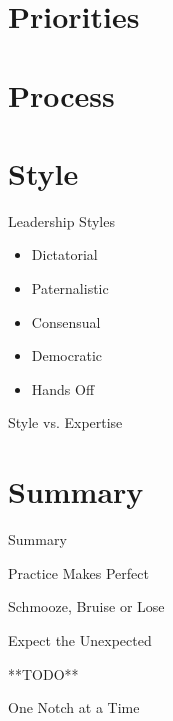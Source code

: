\documentclass[14pt]{beamer}
\begin{document}
  \section{Priorities}
    \blankscreen

    \begin{frame}{}
      
    \end{frame}

  \section{Process}
    \blankscreen

  \section{Style}

    \begin{frame}{Leadership Styles}
      \begin{itemize}
        \item Dictatorial
        \item Paternalistic
        \item Consensual
        \item Democratic
        \item Hands Off
      \end{itemize}
    \end{frame}

    \begin{frame}{Style vs. Expertise}
      
    \end{frame}

  \section*{Summary}

    \begin{frame}{Summary}
      \begin{description}
        \pause
        \item Practice Makes Perfect
        \pause
        \item [Authority] Schmooze, Bruise or Lose
        \pause
        \item [Priorities] Expect the Unexpected
        \pause
        \item [Process] **TODO**
        \pause
        \item [Style] One Notch at a Time
      \end{description}
    \end{frame}
\end{document}
